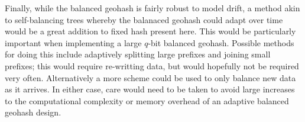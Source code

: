 \documentclass[nips13submit_09,times,art10]{article} %
\begin{document}
Finally, while the balanced geohash is fairly robust to model drift, a method akin to
self-balancing trees whereby the balanaced geohash could adapt over time would be a
great addition to fixed hash present here. This would be particularly important when
implementing a large $q$-bit balanced geohash. Possible methods for doing this include
adaptively splitting large prefixes and joining small prefixes; this would require
re-writting data, but would hopefully not be required very often. Alternatively a more
scheme could be used to only balance new data as it arrives. In either case, care would
need to be taken to avoid large increases to the computational complexity or memory
overhead of an adaptive balanced geohash design.

\nocite{*}

\end{document}
